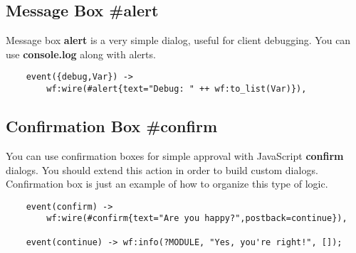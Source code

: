 \subsection{Message Box \#alert}
Message box {\bf alert} is a very simple dialog, useful for client debugging.
You can use {\bf console.log} along with alerts.

\vspace{1\baselineskip}
\begin{lstlisting}
    event({debug,Var}) ->
        wf:wire(#alert{text="Debug: " ++ wf:to_list(Var)}),
\end{lstlisting}

\subsection{Confirmation Box \#confirm}
You can use confirmation boxes for simple approval with JavaScript {\bf confirm} dialogs.
You should extend this action in order to build custom dialogs. Confirmation box is just an example of how to
organize this type of logic.

\vspace{1\baselineskip}
\begin{lstlisting}
    event(confirm) ->
        wf:wire(#confirm{text="Are you happy?",postback=continue}),

    event(continue) -> wf:info(?MODULE, "Yes, you're right!", []);
\end{lstlisting}
\vspace{1\baselineskip}
